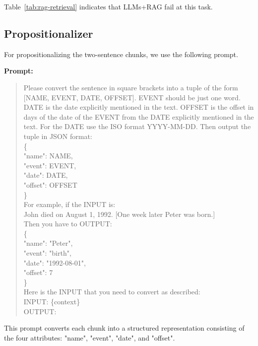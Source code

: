 \documentclass[11pt]{article}
\begin{document}
Table~\ref{tab:rag-retrieval} indicates that LLMs+RAG fail at this task.





\subsection{Propositionalizer}
For  propositionalizing the two-sentence chunks, we use the
following prompt.

\textbf{Prompt:}
\begin{quote}
Please convert the sentence in square brackets into a tuple of the form [NAME, EVENT, DATE, OFFSET]. EVENT should be just one word. DATE is the date explicitly mentioned in the text. OFFSET is the offset in days of the date of the EVENT from the DATE explicitly mentioned in the text. For the DATE use the ISO format YYYY-MM-DD. Then output the tuple in JSON format:\\
\{ \\
"name": NAME, \\
"event": EVENT, \\
"date": DATE, \\
"offset": OFFSET \\
\} \\
For example, if the INPUT is:\\
John died on August 1, 1992. [One week later Peter was born.]\\
Then you have to OUTPUT:\\
\{ \\
"name": "Peter", \\
"event": "birth", \\
"date": "1992-08-01", \\
"offset": 7 \\
\} \\
Here is the INPUT that you need to convert as described: \\
INPUT: \{context\} \\
OUTPUT:
\end{quote}

This prompt 
converts each chunk into a structured
representation consisting of the four attributes: "name", "event",
"date", and "offset".
\end{document}
